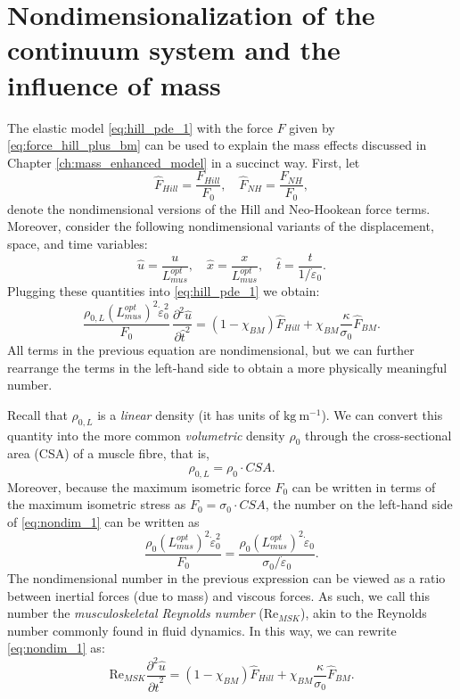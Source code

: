 \documentclass{sfuthesis}
\numberwithin{equation}{section}
\numberwithin{figure}{chapter}
\numberwithin{table}{chapter}
\theoremstyle{definition}
\newcommand{\pder}[2]{\dfrac{\partial #1}{\partial #2}}
\newcommand{\depsilon}{\dot{\varepsilon}}
\begin{document}
\section{Nondimensionalization of the continuum system and the influence of mass}

The elastic model \eqref{eq:hill_pde_1} with the force $F$ given by \eqref{eq:force_hill_plus_bm} can be used to explain the mass effects discussed in Chapter \ref{ch:mass_enhanced_model} in a succinct way. First, let
\begin{equation}
    \widehat{F}_{Hill} = \dfrac{F_{Hill}}{F_0}, \quad \widehat{F}_{NH} = \dfrac{F_{NH}}{F_0},
\end{equation}
denote the nondimensional versions of the Hill and Neo-Hookean force terms. Moreover, consider the following nondimensional variants of the  displacement, space, and time variables:
\begin{equation}
    \widehat{u} = \dfrac{u}{L_{mus}^{opt}}, \quad \widehat{x} = \dfrac{x}{L_{mus}^{opt}}, \quad \widehat{t} = \dfrac{t}{1/\depsilon_0}.
\end{equation}
Plugging these quantities into \eqref{eq:hill_pde_1} we obtain:
\begin{equation} \label{eq:nondim_1}
    \dfrac{\rho_{0,L} (L_{mus}^{opt})^2 \depsilon_0^2}{F_0} \, \pder{^2 \widehat{u}}{\widehat{t}^2} = (1-\chi_{BM}) \widehat{F}_{Hill} + \chi_{BM} \dfrac{\kappa}{\sigma_0} \widehat{F}_{BM}.
\end{equation}
All terms in the previous equation are nondimensional, but we can further rearrange the terms in the left-hand side to obtain a more physically meaningful number. 

Recall that $\rho_{0,L}$ is a \textit{linear} density (it has units of $\text{kg} \ \text{m}^{-1}$). We can convert this quantity into the more common \textit{volumetric} density $\rho_0$ through the cross-sectional area (CSA) of a muscle fibre, that is,
\begin{equation}
    \rho_{0,L} = \rho_0 \cdot CSA.
\end{equation}
Moreover, because the maximum isometric force $F_0$ can be written in terms of the maximum isometric stress as $F_0 = \sigma_0 \cdot CSA$, the number on the left-hand side of \eqref{eq:nondim_1} can be written as
\begin{equation}
    \dfrac{\rho_0 (L_{mus}^{opt})^2 \depsilon_0^2}{F_0} = \dfrac{\rho_0 (L_{mus}^{opt})^2 \depsilon_0}{\sigma_0 / \depsilon_0}.
\end{equation}
The nondimensional number in the previous expression can be viewed as a ratio between inertial forces (due to mass) and viscous forces. As such, we call this number the \textit{musculoskeletal Reynolds number} ($\text{Re}_{MSK}$), akin to the Reynolds number commonly found in fluid dynamics. In this way, we can rewrite \eqref{eq:nondim_1} as:
\begin{equation}
    \text{Re}_{MSK} \pder{^2 \widehat{u}}{\widehat{t}^2} = (1-\chi_{BM}) \widehat{F}_{Hill} + \chi_{BM} \dfrac{\kappa}{\sigma_0} \widehat{F}_{BM}.
\end{equation}
\end{document}
